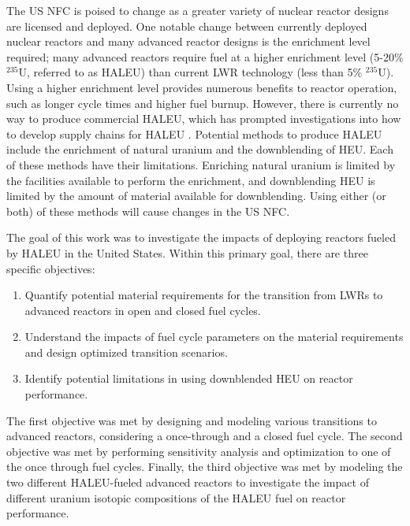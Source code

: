The US \acrfull{NFC} is poised to change as a greater variety of 
nuclear reactor designs are licensed and deployed. One notable change 
between currently deployed nuclear reactors and many advanced 
reactor designs is the enrichment level required; many advanced 
reactors require fuel at a higher enrichment level (5-20\% $^{235}$U, 
referred to as \acrfull{HALEU}) than current \acrfull{LWR} technology 
(less than 5\% $^{235}$U). Using a higher enrichment level provides 
numerous benefits to reactor operation, such as longer cycle 
times and higher fuel burnup. However, there is currently no way 
to produce commercial \gls{HALEU}, which has prompted investigations 
into how to develop supply chains for \gls{HALEU}
\cite{regalbuto_addressing_2020,dixon_estimated_2022}. Potential 
methods to produce \gls{HALEU} include the enrichment of natural 
uranium and the downblending of \acrfull{HEU}. Each of these 
methods have their limitations. Enriching natural 
uranium is limited by the facilities available to perform 
the enrichment, and downblending \gls{HEU} is limited by the 
amount of material available for downblending. Using either (or 
both) of these methods will cause changes in the US \gls{NFC}. 


The goal of this work was to investigate the impacts of deploying reactors 
fueled by \gls{HALEU} in the United States. Within this primary goal, 
there are three specific objectives:
\vspace{0.2cm} 
\noindent
\begin{enumerate}
\item Quantify potential material requirements for the transition 
from \glspl{LWR} to advanced reactors in open and closed 
fuel cycles.

\item Understand the impacts of fuel cycle parameters on the material 
requirements and design optimized transition scenarios.


\item Identify potential limitations in using downblended \gls{HEU} 
on reactor performance.
\end{enumerate}

\noindent The first objective was met by designing and modeling various 
transitions 
to advanced reactors, considering a once-through and a closed 
fuel cycle. The second objective was met by performing sensitivity 
analysis and optimization to one of the once through fuel cycles. 
Finally, the third objective was met by modeling the two different 
\gls{HALEU}-fueled advanced reactors to investigate the impact of 
different uranium isotopic 
compositions of the \gls{HALEU} fuel on reactor performance. 

